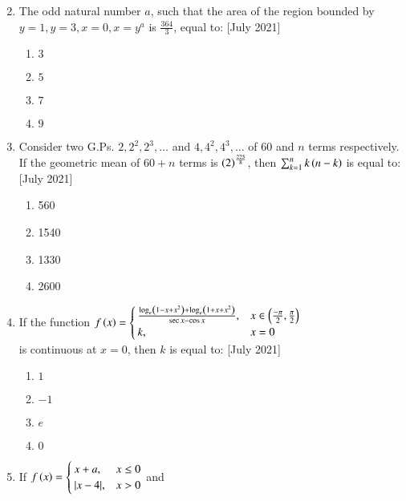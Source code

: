 \documentclass[journal]{IEEEtran}
\begin{document}
\begin{enumerate}
\begin{multicols}{2}
\begin{enumerate}
        \end{enumerate}
    \end{multicols}
    \item The odd natural number $a$, such that the area of the region bounded by $y = 1,y=3,x=0,x=y^a$ is $\frac{364}{3}$, equal to: \hfill{[July 2021]}
    \begin{multicols}{2}
        \begin{enumerate}
            \item $3$
            \item $5$
            \item$7$
            \item $9$
        \end{enumerate}
    \end{multicols}
    \item Consider two G.Ps. $2,2^2,2^3,\dots$ and $4,4^2,4^3,\dots$ of $60$ and $n$ terms respectively. If the geometric mean of $60+n$ terms is $\left(2\right)^\frac{225}{8}$, then $\sum_{k=1}^{n} k\left(n-k\right)$ is equal to: \hfill{[July 2021]}
    \begin{multicols}{2}
        \begin{enumerate}
            \item 560
            \item 1540
            \item 1330
            \item 2600
        \end{enumerate}
    \end{multicols}
    \item If the function 
    $f\left(x\right) = 
    \begin{cases}
        \frac{\log_e\left(1-x+x^2\right)+\log_e\left(1+x+x^2\right)}{\sec{x}-\cos{x}}, &x \in \left(\frac{-\pi}{2},\frac{\pi}{2}\right) \\
    k        ,&x = 0
    \end{cases}$\\
    is continuous at $x=0$, then $k$ is equal to: \hfill{[July 2021]}
    \begin{multicols}{2}
        \begin{enumerate}
            \item $1$
            \item $-1$
            \item$e$
            \item $0$
            
        \end{enumerate}
    \end{multicols}
    \item If $ f\left(x\right) =
        \begin{cases}
            x+a , &x \leq 0 \\
            |x-4|, &x > 0
        \end{cases} $ 
        and
        

\end{enumerate}
\end{document}
